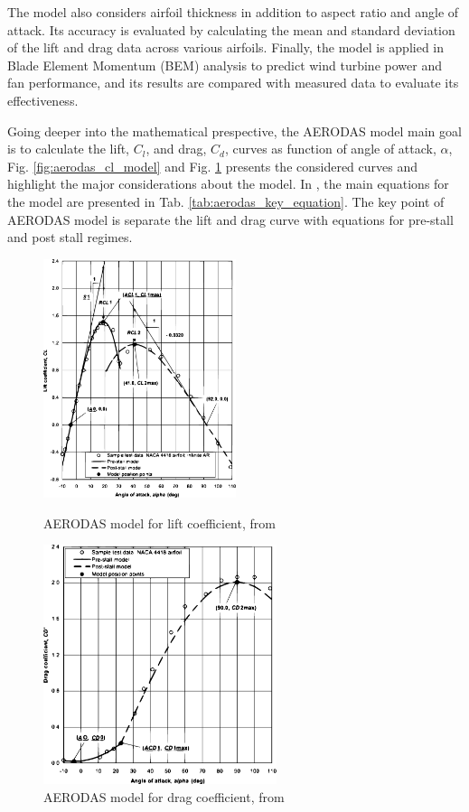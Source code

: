 The model also considers airfoil thickness in addition to aspect ratio and angle of attack. Its accuracy is evaluated by calculating the mean and standard deviation of the lift and drag data across various airfoils. Finally, the model is applied in Blade Element Momentum (BEM) analysis to predict wind turbine power and fan performance, and its results are compared with measured data to evaluate its effectiveness.

Going deeper into the mathematical prespective, the AERODAS model main goal is to calculate the lift, $C_l$, and drag, $C_d$, curves as function of angle of attack, $\alpha$, Fig. \ref{fig:aerodas_cl_model} and Fig. \ref{fig:aerodas_cd_model} presents the considered curves and highlight the major considerations about the model. In \cite{spera_models_2008}, the main equations for the model are presented in Tab. \ref{tab:aerodas_key_equation}. The key point of AERODAS model is separate the lift and drag curve with equations for pre-stall and post stall regimes.

\begin{figure}[!htb]
	\centering
	\begin{minipage}{0.45\textwidth}
		\centering
		\includegraphics[height=7cm]{Figures/background/aero/liftmodel_aerodas.eps}
		\caption{AERODAS model for lift coefficient, from \cite{spera_models_2008}}
		\label{fig:aerodas_cl_model}
	\end{minipage}
	\hfill
    \begin{minipage}{0.45\textwidth}
		\centering
		\includegraphics[height=7cm]{Figures/background/aero/dragmodel_aerodas.eps}
		\caption{AERODAS model for drag coefficient, from \cite{spera_models_2008}}
		\label{fig:aerodas_cd_model}
	\end{minipage}
\end{figure}

